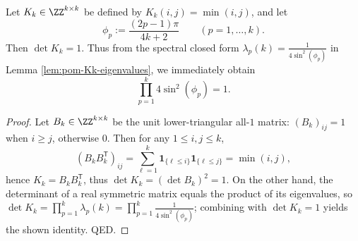 
\begin{corollary}[Spectral Product Rigidity of Integer Gram Normalization: \texorpdfstring{$\prod_{p=1}^k4\sin^2(\phi_p)=1$}{prod 4 sin^2(phi)=1}]\label{cor:pom-Kk-det-sine-product-normalization}
Let \(K_k\in\ZZ^{k\times k}\) be defined by \(K_k(i,j)=\min(i,j)\), and let
\[
\phi_p:=\frac{(2p-1)\pi}{4k+2}\qquad(p=1,\dots,k).
\]
Then \(\det K_k=1\).
Thus from the spectral closed form \(\lambda_p(k)=\frac{1}{4\sin^2(\phi_p)}\) in Lemma \ref{lem:pom-Kk-eigenvalues}, we immediately obtain
\[
\boxed{\;\prod_{p=1}^{k}4\sin^2(\phi_p)=1.\;}
\]
\end{corollary}
\begin{proof}
Let \(B_k\in\ZZ^{k\times k}\) be the unit lower-triangular all-\(1\) matrix: \((B_k)_{ij}=1\) when \(i\ge j\), otherwise \(0\).
Then for any \(1\le i,j\le k\),
\[
(B_kB_k^{\mathsf T})_{ij}=\sum_{\ell=1}^{k}\mathbf{1}_{\{\ell\le i\}}\mathbf{1}_{\{\ell\le j\}}=\min(i,j),
\]
hence \(K_k=B_kB_k^{\mathsf T}\), thus \(\det K_k=(\det B_k)^2=1\).
On the other hand, the determinant of a real symmetric matrix equals the product of its eigenvalues, so
\(
\det K_k=\prod_{p=1}^{k}\lambda_p(k)
=\prod_{p=1}^{k}\frac{1}{4\sin^2(\phi_p)}
\);
combining with \(\det K_k=1\) yields the shown identity. QED.
\end{proof}


